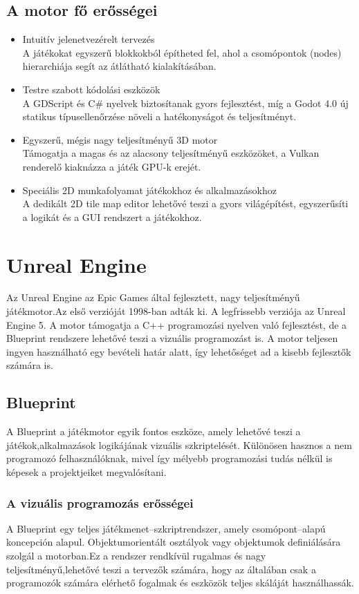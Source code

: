 \documentclass[
]{thesis-ekf}
\theoremstyle{definition}
\theoremstyle{remark}
\begin{document}
\subsection{A motor fő erősségei}
\begin{itemize}
	\item Intuitív jelenetvezérelt tervezés \\ A játékokat egyszerű blokkokból építheted fel, ahol a csomópontok (nodes) hierarchiája segít az átlátható kialakításában.
	\item Testre szabott kódolási eszközök \\ A GDScript és C\# nyelvek biztosítanak gyors fejlesztést, míg a Godot 4.0 új statikus típusellenőrzése növeli a hatékonyságot és teljesítményt.
	\item Egyszerű, mégis nagy teljesítményű 3D motor \\ Támogatja a magas és az alacsony teljesítményű eszközöket, a Vulkan renderelő kiaknázza a játék GPU-k erejét.
	\item Speciális 2D munkafolyamat játékokhoz és alkalmazásokhoz \\ A dedikált 2D tile map editor lehetővé teszi a gyors világépítést, egyszerűsíti a logikát és a GUI rendszert a játékokhoz.
\end{itemize}
\section{Unreal Engine}

Az Unreal Engine az Epic Games által fejlesztett, nagy teljesítményű játékmotor.Az első verzióját 1998-ban adták ki. A legfrissebb verziója az Unreal Engine 5. A motor támogatja a C++ programozási nyelven való fejlesztést, de a Blueprint rendszere lehetővé teszi a vizuális programozást is. A motor teljesen ingyen használható egy bevételi határ alatt, így lehetőséget ad a kisebb fejlesztők számára is.

\subsection{Blueprint}
A Blueprint a játékmotor egyik fontos eszköze, amely lehetővé teszi a játékok,alkalmazások logikájának vizuális szkriptelését. Különösen hasznos a nem programozó felhasználóknak, mivel így mélyebb programozási tudás nélkül is képesek a projektjeiket megvalósítani. 
\subsubsection{A vizuális programozás erősségei}
A Blueprint egy teljes játékmenet--szkriptrendszer, amely csomópont--alapú koncepción alapul. Objektumorientált osztályok vagy objektumok definiálására szolgál a motorban.Ez a rendszer rendkívül rugalmas és nagy teljesítményű,lehetővé teszi a tervezők számára, hogy az általában csak a programozók számára elérhető fogalmak és eszközök teljes skáláját használhassák.
\end{document}
